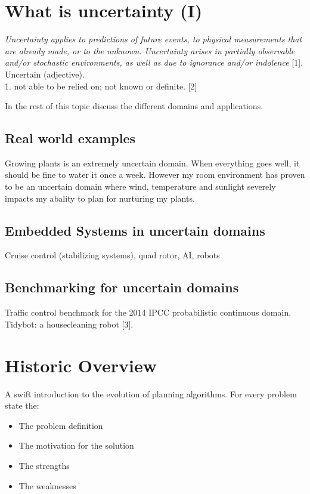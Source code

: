 \documentclass[runningheads,a4paper]{llncs}
\begin{document}
\section{What is uncertainty (I)}

\emph{Uncertainty applies to predictions of future events, to physical measurements that are already made, or to the unknown. Uncertainty arises in partially observable and/or stochastic environments, as well as due to ignorance and/or indolence} [1]. \\

Uncertain (adjective). \\
1. not able to be relied on; not known or definite. [2]

In the rest of this topic discuss the different domains and applications.

\subsection{Real world examples}

Growing plants is an extremely uncertain domain. When everything goes well, it should be fine to water it once a week. However my room environment has proven to be an uncertain domain where wind, temperature and sunlight severely impacts my abality to plan for nurturing my plants.

\subsection{Embedded Systems in uncertain domains}

Cruise control (stabilizing systems), quad rotor, AI, robots

\subsection{Benchmarking for uncertain domains}

Traffic control benchmark for the 2014 IPCC probabilistic continuous domain.
Tidybot: a housecleaning robot [3]. \\


\section{Historic Overview}
A swift introduction to the evolution of planning algorithms. For every problem state the:
\begin{itemize}
	\item The problem definition
	\item The motivation for the solution
	\item The strengths
	\item The weaknesses
\end{itemize}
\end{document}
